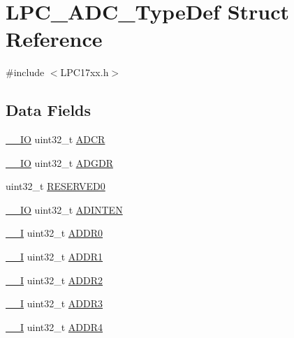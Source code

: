 \hypertarget{structLPC__ADC__TypeDef}{}\section{L\+P\+C\+\_\+\+A\+D\+C\+\_\+\+Type\+Def Struct Reference}
\label{structLPC__ADC__TypeDef}


{\ttfamily \#include $<$L\+P\+C17xx.\+h$>$}

\subsection*{Data Fields}
\begin{DoxyCompactItemize}
\item 
\hyperlink{LPC17xx_8h_aec43007d9998a0a0e01faede4133d6be}{\+\_\+\+\_\+\+IO} uint32\+\_\+t \hyperlink{structLPC__ADC__TypeDef_ab0949d845f781071595de5c830fab8a7}{A\+D\+CR}
\item 
\hyperlink{LPC17xx_8h_aec43007d9998a0a0e01faede4133d6be}{\+\_\+\+\_\+\+IO} uint32\+\_\+t \hyperlink{structLPC__ADC__TypeDef_a9a3d600737fba2be947a6b528cc48891}{A\+D\+G\+DR}
\item 
uint32\+\_\+t \hyperlink{structLPC__ADC__TypeDef_a40cf73fb4dbf0486e17c338b59481012}{R\+E\+S\+E\+R\+V\+E\+D0}
\item 
\hyperlink{LPC17xx_8h_aec43007d9998a0a0e01faede4133d6be}{\+\_\+\+\_\+\+IO} uint32\+\_\+t \hyperlink{structLPC__ADC__TypeDef_a3867c156abd33ddafeb3b51e7b1da97c}{A\+D\+I\+N\+T\+EN}
\item 
\hyperlink{LPC17xx_8h_af63697ed9952cc71e1225efe205f6cd3}{\+\_\+\+\_\+I} uint32\+\_\+t \hyperlink{structLPC__ADC__TypeDef_a3168f35782efa83907f5a1001b5a53e7}{A\+D\+D\+R0}
\item 
\hyperlink{LPC17xx_8h_af63697ed9952cc71e1225efe205f6cd3}{\+\_\+\+\_\+I} uint32\+\_\+t \hyperlink{structLPC__ADC__TypeDef_a7413587e4871c63fecf13646dce2f873}{A\+D\+D\+R1}
\item 
\hyperlink{LPC17xx_8h_af63697ed9952cc71e1225efe205f6cd3}{\+\_\+\+\_\+I} uint32\+\_\+t \hyperlink{structLPC__ADC__TypeDef_a806e8066ea08898ff51e5ff2f10823b3}{A\+D\+D\+R2}
\item 
\hyperlink{LPC17xx_8h_af63697ed9952cc71e1225efe205f6cd3}{\+\_\+\+\_\+I} uint32\+\_\+t \hyperlink{structLPC__ADC__TypeDef_acac24a0ba2d73729b86a021bcad63ad6}{A\+D\+D\+R3}
\item 
\hyperlink{LPC17xx_8h_af63697ed9952cc71e1225efe205f6cd3}{\+\_\+\+\_\+I} uint32\+\_\+t \hyperlink{structLPC__ADC__TypeDef_a92bfddc3c7b32379c91fcde0f43df495}{A\+D\+D\+R4}

\end{DoxyCompactItemize}
